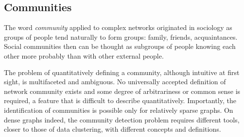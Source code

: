 \documentclass[11pt,              a4paper,              twoside,openright,              titlepage,              headinclude,footinclude,                            numbers=noenddot,              cleardoublepage=empty,]{scrreprt}
\begin{document}
\subsection{Communities}\label{sec:communities}
The word \emph{community} applied to complex networks originated in sociology as groups of people tend naturally to form groups: family, friends, acquaintances.
Social communities then can be thought as subgroups of people knowing each other more probably than with other external people.

The problem of quantitatively defining a community, although intuitive at first sight, is multifaceted and ambiguous. No universally accepted definition of network community exists and some degree of arbitrariness or common sense is required, a feature that is difficult to describe quantitatively.
Importantly, the identification of communities is possible only for relatively sparse graphs. On dense graphs indeed, the community detection problem requires different tools, closer to those of data clustering, with different concepts and definitions.
\end{document}
